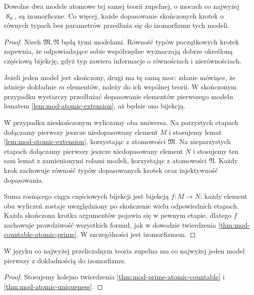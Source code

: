 \begin{twierdzenie}
\label{thm:mod-atomic-uniqueness}
Dowolne dwa modele atomowe tej samej teorii zupełnej,
o mocach co najwyżej $\aleph_0$, są izomorficzne.
Co więcej, każde dopasowanie skończonych krotek
o równych typach bez parametrów przedłuża się
do izomorfizmu tych modeli.
\end{twierdzenie}
\begin{proof}
Niech $\mathfrak M,\mathfrak N$ będą tymi modelami.
Równość typów początkowych krotek zapewnia,
że odpowiadające sobie współrzędne wyznaczają
dobrze określoną częściową bijekcję, gdyż
typ zawiera informacje o równościach i nierównościach.

Jeżeli jeden model jest skończony, drugi ma
tę samą moc: zdanie mówiące, że istnieje dokładnie
$m$ elementów, należy do ich wspólnej teorii.
W skończonym przypadku wystarczy przedłużać
dopasowanie elementów pierwszego modelu
lematem \ref{lem:mod-atomic-extension}, aż będzie
ono bijekcją.

W przypadku nieskończonym wyliczamy oba uniwersa.
Na parzystych etapach dołączamy pierwszy jeszcze
niedopasowany element $M$ i stosujemy lemat
\ref{lem:mod-atomic-extension}, korzystając
z atomowości $\mathfrak M$.
Na nieparzystych etapach dołączamy pierwszy jeszcze
niedopasowany element $N$ i stosujemy ten sam lemat
z zamienionymi rolami modeli, korzystając
z atomowości $\mathfrak N$.
Każdy krok zachowuje równość typów dopasowanych
krotek oraz injektywność dopasowania.

Suma rosnącego ciągu częściowych bijekcji
jest bijekcją $f:M\to N$: każdy element obu
wyliczeń zostaje uwzględniony po skończenie
wielu odpowiednich etapach.
Każda skończona krotka argumentów pojawia się
w pewnym etapie, dlatego $f$ zachowuje prawdziwość
wszystkich formuł, jak w dowodzie twierdzenia
\ref{thm:mod-countable-atomic-prime}.
W szczególności jest izomorfizmem.
\end{proof}

\begin{wniosek}
\label{cor:mod-prime-uniqueness}
W języku co najwyżej przeliczalnym teoria zupełna
ma co najwyżej jeden model pierwszy z dokładnością
do izomorfizmu.
\end{wniosek}
\begin{proof}
Stosujemy kolejno twierdzenia
\ref{thm:mod-prime-atomic-countable}
i \ref{thm:mod-atomic-uniqueness}.
\end{proof}


